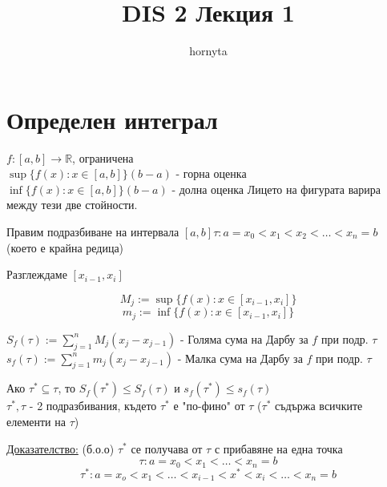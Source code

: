 \documentclass{article}
\author{hornyta}
\title{DIS 2 Лекция 1}
\newcommand{\tvurdenie}[2]{
    \begin{tcolorbox}[title = #1 ,colframe = blue!70!black, colback = blue!10!white]
        #2
    \end{tcolorbox}
}
\newcommand{\opredelenie}[2]{
    \begin{tcolorbox}[title = #1 ,colframe = red!70!black, colback = red!10!white]
        #2
    \end{tcolorbox}
}
\begin{document}
\maketitle

\section{Определен интеграл}

\begin{minipage}{0.39\linewidth}
    
\end{minipage}
\begin{minipage}{0.6\linewidth}
        \(f:[a,b] \to \mathbb{R} \), ограничена \\
        \(\sup\{ f(x) : x \in [a, b] \} (b-a)\) - горна оценка\\
        \(\inf\{ f(x) : x \in [a, b] \} (b-a)\) - долна оценка
        Лицето на фигурата варира между тези две стойности.
\end{minipage}
Правим подразбиване на интервала \([a, b] \tau: a=x_0<x_1<x_2<\dots<x_n=b\)
(което е крайна редица)
    
\begin{minipage}{0.39\linewidth}
    
\end{minipage}
\begin{minipage}{0.6\linewidth}
    \begin{center}
        Разглеждаме \([x_{i-1}, x_i]\)
    \end{center}
    \[M_j := \sup\{f(x) : x \in [x_{i-1}, x_i] \}\]
    \[m_j := \inf\{f(x) : x \in [x_{i-1}, x_i] \}\]
\end{minipage}
\opredelenie{Суми на Дарбу}{
\(S_f(\tau) := \sum_{j=1}^{n} M_j(x_j-x_{j-1})\) - Голяма сума на Дарбу за \(f\) при подр. \(\tau\)
\(s_f(\tau) := \sum_{j=1}^{n} m_j(x_j-x_{j-1})\) - Малка сума на Дарбу за \(f\) при подр. \(\tau\)
}
\tvurdenie{Лема 1}{Ако \(\tau^* \subseteq \tau \), то \(S_f(\tau^*) \le S_f(\tau)\) и \(s_f(\tau^*) \le s_f(\tau)\)
    \\\(\tau^*, \tau\) - 2 подразбивания, където \(\tau^*\) е "по-фино" от \(\tau\) (\(\tau^*\) съдържа всичките елементи на \(\tau\))
}
\underline{Доказателство:} (б.о.о) \(\tau^*\) се получава от \(\tau\) с прибавяне на една точка
\[\tau: a=x_0<x_1<\dots<x_n=b\]
\[\tau^*: a=x_o<x_1<\dots<x_{i-1}<x^*<x_i<\dots<x_n=b\]
    
\end{document}
